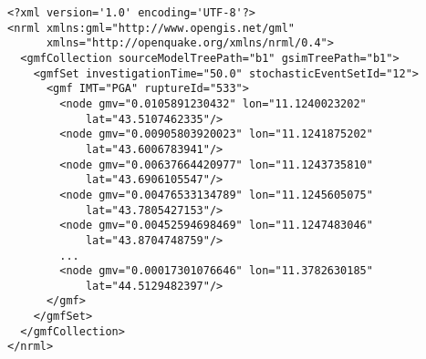 \begin{Verbatim}[frame=single, commandchars=\\\{\}, fontsize=\small]
<?xml version='1.0' encoding='UTF-8'?>
<nrml xmlns:gml="http://www.opengis.net/gml"
      xmlns="http://openquake.org/xmlns/nrml/0.4">
  <gmfCollection sourceModelTreePath="b1" gsimTreePath="b1">
    <gmfSet investigationTime="50.0" stochasticEventSetId="12">
      <gmf IMT="PGA" ruptureId="533">
        <node gmv="0.0105891230432" lon="11.1240023202"
            lat="43.5107462335"/>
        <node gmv="0.00905803920023" lon="11.1241875202"
            lat="43.6006783941"/>
        <node gmv="0.00637664420977" lon="11.1243735810"
            lat="43.6906105547"/>
        <node gmv="0.00476533134789" lon="11.1245605075"
            lat="43.7805427153"/>
        <node gmv="0.00452594698469" lon="11.1247483046"
            lat="43.8704748759"/>
        ...
        <node gmv="0.00017301076646" lon="11.3782630185"
            lat="44.5129482397"/>
      </gmf>
    </gmfSet>
  </gmfCollection>
</nrml>
\end{Verbatim}